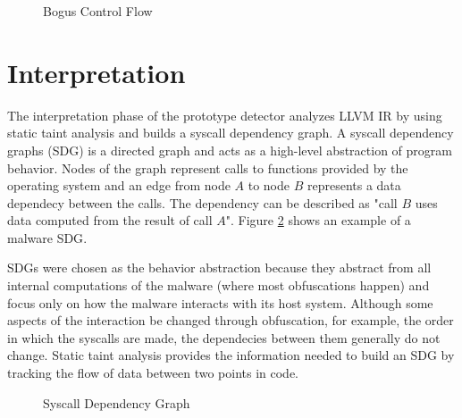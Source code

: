 \begin{figure}[H]
    \centering
    \caption{Bogus Control Flow}
    \label{fig_bcf}
\end{figure}

\section{Interpretation}
\label{s_sdg}
The interpretation phase of the prototype detector analyzes \textsc{LLVM IR} by using static taint analysis and builds a syscall dependency graph. A syscall dependency graphs (\textsc{SDG}) is a directed graph and acts as a high-level abstraction of program behavior. Nodes of the graph represent calls to functions provided by the operating system and an edge from node $A$ to node $B$ represents a data dependecy between the calls. The dependency can be described as "call $B$ uses data computed from the result of call $A$". Figure \ref{fig_sdg} shows an example of a malware \textsc{SDG}. 

SDGs were chosen as the behavior abstraction because they abstract from all internal computations of the malware (where most obfuscations happen) and focus only on how the malware interacts with its host system. Although some aspects of the interaction be changed through obfuscation, for example, the order in which the syscalls are made, the dependecies between them generally do not change. Static taint analysis provides the information needed to build an \textsc{SDG} by tracking the flow of data between two points in code.

\begin{figure}[H]
    \centering
    \caption{Syscall Dependency Graph}
    \label{fig_sdg}
\end{figure}


